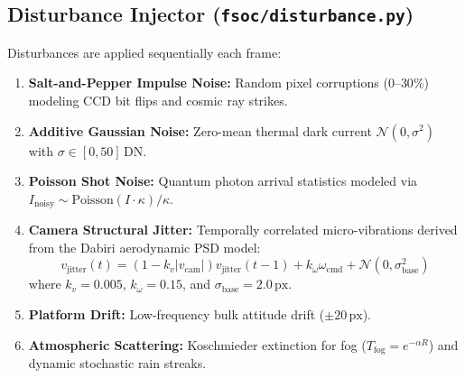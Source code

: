 \documentclass[11pt,a4paper]{article}
\begin{document}
\subsection{Disturbance Injector (\texttt{fsoc/disturbance.py})}
Disturbances are applied sequentially each frame:
\begin{enumerate}[noitemsep,topsep=2pt]
    \item \textbf{Salt-and-Pepper Impulse Noise:} Random pixel corruptions ($0$--$30\%$) modeling CCD bit flips and cosmic ray strikes.
    \item \textbf{Additive Gaussian Noise:} Zero-mean thermal dark current $\mathcal{N}(0, \sigma^2)$ with $\sigma \in [0, 50]\,\text{DN}$.
    \item \textbf{Poisson Shot Noise:} Quantum photon arrival statistics modeled via $I_{\text{noisy}} \sim \text{Poisson}(I \cdot \kappa)/\kappa$.
    \item \textbf{Camera Structural Jitter:} Temporally correlated micro-vibrations derived from the Dabiri aerodynamic PSD model:
    \begin{equation}
        v_{\text{jitter}}(t) = (1 - k_v |v_{\text{cam}}|) v_{\text{jitter}}(t-1) + k_\omega \omega_{\text{cmd}} + \mathcal{N}(0, \sigma_{\text{base}}^2)
    \end{equation}
    where $k_v = 0.005$, $k_\omega = 0.15$, and $\sigma_{\text{base}} = 2.0\,\text{px}$.
    \item \textbf{Platform Drift:} Low-frequency bulk attitude drift ($\pm 20\,\text{px}$).
    \item \textbf{Atmospheric Scattering:} Koschmieder extinction for fog ($T_{\text{fog}} = e^{-\alpha R}$) and dynamic stochastic rain streaks.
\end{enumerate}
\end{document}
